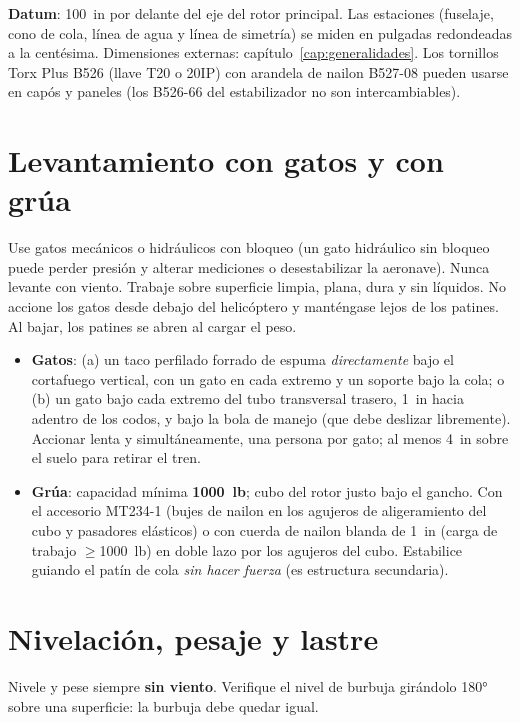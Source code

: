 \textbf{Datum}: 100~in por delante del eje del rotor principal. Las estaciones (fuselaje, cono de cola, línea de agua y línea de simetría) se miden en pulgadas redondeadas a la centésima. Dimensiones externas: capítulo~\ref{cap:generalidades}. Los tornillos Torx Plus B526 (llave T20 o 20IP) con arandela de nailon B527-08 pueden usarse en capós y paneles (los B526-66 del estabilizador no son intercambiables).

\section{Levantamiento con gatos y con grúa}

\begin{precaucion}
Use gatos mecánicos o hidráulicos con bloqueo (un gato hidráulico sin bloqueo puede perder presión y alterar mediciones o desestabilizar la aeronave). Nunca levante con viento. Trabaje sobre superficie limpia, plana, dura y sin líquidos. No accione los gatos desde debajo del helicóptero y manténgase lejos de los patines. Al bajar, los patines se abren al cargar el peso.
\end{precaucion}

\begin{itemize}
\item \textbf{Gatos}: (a) un taco perfilado forrado de espuma \emph{directamente} bajo el cortafuego vertical, con un gato en cada extremo y un soporte bajo la cola; o (b) un gato bajo cada extremo del tubo transversal trasero, 1~in hacia adentro de los codos, y bajo la bola de manejo (que debe deslizar libremente). Accionar lenta y simultáneamente, una persona por gato; al menos 4~in sobre el suelo para retirar el tren.
\item \textbf{Grúa}: capacidad mínima \textbf{1000~lb}; cubo del rotor justo bajo el gancho. Con el accesorio MT234-1 (bujes de nailon en los agujeros de aligeramiento del cubo y pasadores elásticos) o con cuerda de nailon blanda de 1~in (carga de trabajo $\ge$1000~lb) en doble lazo por los agujeros del cubo. Estabilice guiando el patín de cola \emph{sin hacer fuerza} (es estructura secundaria).
\end{itemize}

\section{Nivelación, pesaje y lastre}

Nivele y pese siempre \textbf{sin viento}. Verifique el nivel de burbuja girándolo 180° sobre una superficie: la burbuja debe quedar igual.

